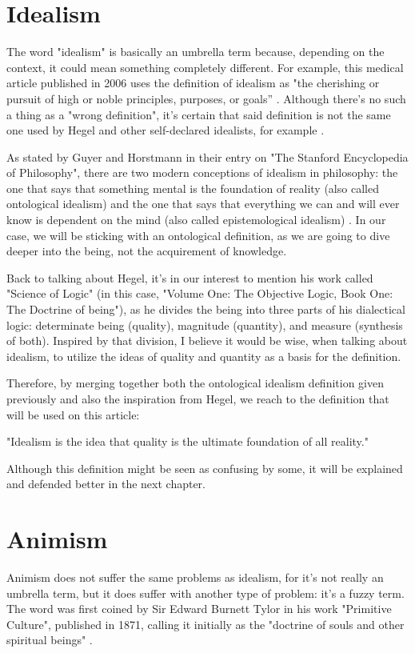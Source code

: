 \section{Idealism}
The word "idealism" is basically an umbrella term because, depending on the context, it could mean
something completely different. For example, this medical article published in 2006 uses the
definition of idealism as "the cherishing or pursuit of high or noble principles, purposes, or
goals” \cite{Smith2006}. Although there's no such a thing as a "wrong definition", it's certain
that said definition is not the same one used by Hegel and other self-declared idealists, for
example \cite{Beiser2009}.

As stated by Guyer and Horstmann in their entry on "The Stanford Encyclopedia of Philosophy",
there are two modern conceptions of idealism in philosophy: the one that says that something
mental is the foundation of reality (also called ontological idealism) and the one that says
that everything we can and will ever know is dependent on the mind (also called epistemological
idealism) \cite{Guyer2023}. In our case, we will be sticking with an ontological definition, as
we are going to dive deeper into the being, not the acquirement of knowledge.

Back to talking about Hegel, it's in our interest to mention his work called "Science of Logic"
(in this case, "Volume One: The Objective Logic, Book One: The Doctrine of being"), as he divides the
being into three parts of his dialectical logic: determinate being (quality), magnitude (quantity),
and measure (synthesis of both). Inspired by that division, I believe it would be wise, when talking
about idealism, to utilize the ideas of quality and quantity as a basis for the definition.

Therefore, by merging together both the ontological idealism definition given previously and also
the inspiration from Hegel, we reach to the definition that will be used on this article:

\begin{center}
    \itshape
    \parbox{0.7\textwidth}{
    "Idealism is the idea that quality is the ultimate foundation of all reality." 
    }
\end{center}

Although this definition might be seen as confusing by some, it will be explained and defended better
in the next chapter.

\section{Animism}
Animism does not suffer the same problems as idealism, for it's not really an umbrella term, but it does
suffer with another type of problem: it's a fuzzy term. The word was first coined by Sir Edward Burnett
Tylor in his work "Primitive Culture", published in 1871, calling it initially as the "doctrine of souls
and other spiritual beings" \cite{Tylor1871}.

